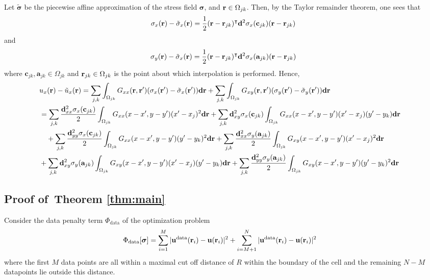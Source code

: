 \documentclass[aps,prl,reprint,twocolumn,groupedaddress,showpacs]{revtex4}
\newcommand{\bsigma}{{\boldsymbol\sigma}}
\def\d{{\bf d}}
\def\r{{\bf r}}
\def\u{{\bf u}}
\newcommand{\bs}{\boldsymbol{\sigma}}
\begin{document}
\begin{widetext}
Let $\tilde{\bsigma}$ be the piecewise affine approximation of the stress field $\bsigma$, and $\r\in\Omega_{jk}$. Then,
by the Taylor remainder theorem, one sees that
$$
\sigma_{x}(\r) - \tilde{\sigma}_x(\r) = \frac{1}{2}(\r-\r_{jk})^\intercal\d^2\sigma_{x}(\mathbf{c}_{jk})(\r-\r_{jk})
$$
and
$$
\sigma_{y}(\r) - \tilde{\sigma}_x(\r) = \frac{1}{2}(\r-\r_{jk})^\intercal\d^2\sigma_{x}(\mathbf{a}_{jk})(\r-\r_{jk})
$$
where $\mathbf{c}_{jk},\mathbf{a}_{jk}\in\Omega_{jk}$ and $\r_{jk}\in\Omega_{jk}$ is the point about which interpolation is performed.
Hence,
{\small
\begin{align}
\lefteqn{u_x(\r) - \tilde{u}_x(\r)  = \sum_{j,k}\int_{\Omega_{jk}} G_{xx} (\r,\r')(\sigma_{x}(\r') - \tilde{\sigma}_x(\r')) \d\r 
 +\sum_{j,k}\int_{\Omega_{jk}} G_{xy} (\r,\r')(\sigma_{y}(\r') - \tilde{\sigma}_y(\r')) \d\r } \nonumber\\
&= \sum_{j,k} \frac{\d_{xx}^2\sigma_x(\mathbf{c}_{jk})}{2}\int_{\Omega_{jk}} G_{xx}(x-x',y-y')  (x'-x_j)^2 \d\r + \sum_{j,k} {\d_{xy}^2\sigma_x(\mathbf{c}_{jk})}\int_{\Omega_{jk}} G_{xx}(x-x',y-y')  (x'-x_j)(y'-y_k)\d\r \nonumber\\
&\quad + \sum_{j,k} \frac{\d_{yy}^2\sigma_x(\mathbf{c}_{jk})}{2}\int_{\Omega_{jk}} G_{xx}(x-x',y-y')  (y'-y_k)^2\d\r   + \sum_{j,k} \frac{\d_{xx}^2\sigma_y(\mathbf{a}_{jk})}{2}\int_{\Omega_{jk}} G_{xy}(x-x',y-y')  (x'-x_j)^2\d\r \nonumber\\
&  + \sum_{j,k} {\d_{xy}^2\sigma_y(\mathbf{a}_{jk})}\int_{\Omega_{jk}} G_{xy}(x-x',y-y')  (x'-x_j)(y'-y_k)\d\r + \sum_{j,k} \frac{\d_{yy}^2\sigma_y(\mathbf{a}_{jk})}{2}\int_{\Omega_{jk}} G_{xy}(x-x',y-y')  (y'-y_k)^2\d\r 
\end{align}
}

\subsection{Proof of~Theorem \ref{thm:main}}

Consider the data penalty term $\Phi_{\textrm{data}}$ of the optimization problem
\begin{align*}
\Phi_{\rm data}[\bs] &=\sum_{i=1}^{M}\vert \u^{\rm
  data}(\r_{i})- \u(\r_i)\vert^{2}  + \sum_{i=M+1}^{N}\vert \u^{\rm
  data}(\r_{i})- \u(\r_i)\vert^{2} 
\end{align*}
where the first $M$ data points are all within a maximal cut off distance of $R$ within the boundary of the cell and the remaining $N-M$ datapoints lie outside this distance.
\end{widetext}



\end{document}
